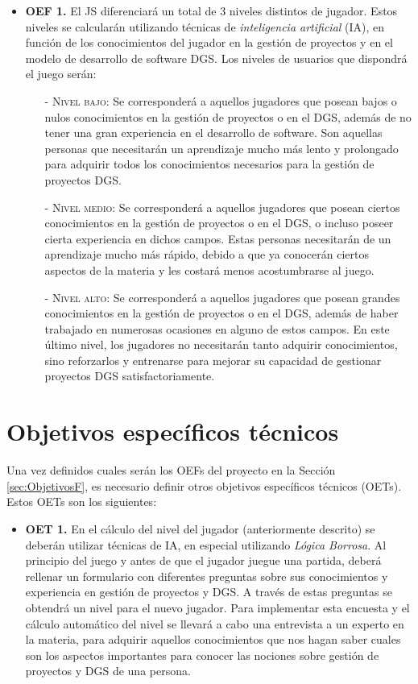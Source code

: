 \begin{itemize}
	\item \textbf{OEF 1.} El JS diferenciará un total de 3 niveles distintos de jugador. Estos niveles se calcularán utilizando técnicas de \emph{inteligencia artificial} (IA), en función de los conocimientos del jugador en la gestión de proyectos y en el modelo de desarrollo de software DGS. Los niveles de usuarios que dispondrá el juego serán:
	\begin{itemize}
		\item[-] \textsc{Nivel bajo:} Se corresponderá a aquellos jugadores que posean bajos o nulos conocimientos en la gestión de proyectos o en el DGS, además de no tener una gran experiencia en el desarrollo de software. Son aquellas personas que necesitarán un aprendizaje mucho más lento y prolongado para adquirir todos los conocimientos necesarios para la gestión de proyectos DGS.
		\item[-] \textsc{Nivel medio:} Se corresponderá a aquellos jugadores que posean ciertos conocimientos en la gestión de proyectos o en el DGS, o incluso poseer cierta experiencia en dichos campos. Estas personas necesitarán de un aprendizaje mucho más rápido, debido a que ya conocerán ciertos aspectos de la materia y les costará menos acostumbrarse al juego.
		\item[-] \textsc{Nivel alto:} Se corresponderá a aquellos jugadores que posean grandes conocimientos en la gestión de proyectos o en el DGS, además de haber trabajado en numerosas ocasiones en alguno de estos campos. En este último nivel, los jugadores no necesitarán tanto adquirir conocimientos, sino reforzarlos y entrenarse para mejorar su capacidad de gestionar proyectos DGS satisfactoriamente.
	\end{itemize}
\end{itemize}


\section{Objetivos específicos técnicos}
\label{sec:ObjetivosT}

Una vez definidos cuales serán los OEFs del proyecto en la Sección \ref{sec:ObjetivosF}, es necesario definir otros objetivos específicos técnicos (OETs). Estos OETs son los siguientes:

\begin{itemize}
	\item \textbf{OET 1.} En el cálculo del nivel del jugador (anteriormente descrito) se deberán utilizar técnicas de IA, en especial utilizando \emph{Lógica Borrosa}. Al principio del juego y antes de que el jugador juegue una partida, deberá rellenar un formulario con diferentes preguntas sobre sus conocimientos y experiencia en gestión de proyectos y DGS. A través de estas preguntas se obtendrá un nivel para el nuevo jugador. Para implementar esta encuesta y el cálculo automático del nivel se llevará a cabo una entrevista a un experto en la materia, para adquirir aquellos conocimientos que nos hagan saber cuales son los aspectos importantes para conocer las nociones sobre gestión de proyectos y DGS de una persona. 
\end{itemize}